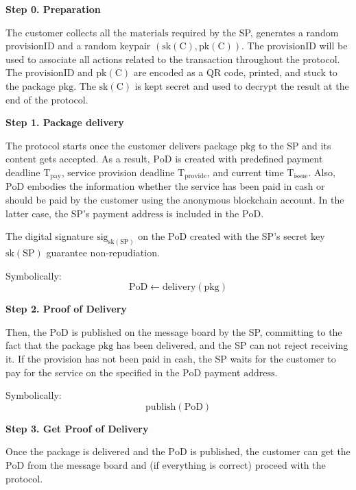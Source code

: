 \noindent \textbf
{Step 0.  Preparation}\label{step-0-preparation}

The customer collects all the $\mathrm{materials}$ required by the SP, generates a random $\mathrm{provisionID}$ and a random keypair $(\mathrm{sk(C)},\mathrm{pk(C)})$. The $\mathrm{provisionID}$ will be used to associate all actions related to the transaction throughout the protocol. The $\mathrm{provisionID}$ and $\mathrm{pk(C)}$ are encoded as a QR code, printed, and stuck to the package $\mathrm{pkg}$. The $\mathrm{sk(C)}$ is kept secret and used to decrypt the $\mathrm{result}$ at the end of the protocol.

\noindent \textbf
{Step 1. Package delivery}\label{step-1-package-delivery}

The protocol starts once the customer delivers package $\mathrm{pkg}$ to the SP and its content gets accepted. As a result, $\mathrm{PoD}$ is created with predefined payment deadline $\mathrm{T}_\mathrm{pay}$, service provision deadline $\mathrm{T}_\mathrm{provide}$, and current time $\mathrm{T}_\mathrm{issue}$. Also, $\mathrm{PoD}$ embodies the information whether the service has been paid in cash or should be paid by the customer using the anonymous blockchain account. In the latter case, the SP's payment $\mathrm{address}$ is included in the $\mathrm{PoD}$.

The digital signature $\mathrm{sig}_{\mathrm{sk}(\mathrm{SP})}$ on the $\mathrm{PoD}$ created with the SP's secret key $\mathrm{sk}(\mathrm{SP})$ guarantee non-repudiation.

Symbolically: 
\[
\mathrm{PoD \gets delivery(pkg)}
\]

\noindent \textbf
{Step 2. Proof of Delivery}\label{step-2-pod}

Then, the $\mathrm{PoD}$ is published on the message board by the SP, committing to the fact that the package $\mathrm{pkg}$ has been delivered, and the SP can not reject receiving it. If the provision has not been paid in cash, the SP waits for the customer to pay for the service on the specified in the $\mathrm{PoD}$ payment $\mathrm{address}$.

Symbolically: 
\[
\mathrm{publish(PoD)}
\]

\noindent \textbf
{Step 3. Get Proof of Delivery}\label{step-3-get-pod}

Once the package is delivered and the $\mathrm{PoD}$ is published, the customer can get the $\mathrm{PoD}$ from the message board and (if everything is correct) proceed with the protocol.

